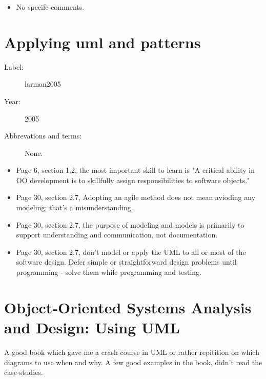 \begin{itemize}
    \item No specifc comments.
\end{itemize}

\section{Applying uml and patterns}


\begin{description}
    \item[Label:] larman2005 \cite{larman2005}
    \item[Year:] 2005
    \item[Abbrevations and terms:] None.
\end{description}

\begin{itemize}
    \item Page 6, section 1.2, the most important skill to learn is "A critical
        ability in OO development is to skillfully assign responsibilities to
        software objects."
    \item Page 30, section 2.7, Adopting an agile method does not mean avioding
        any modeling; that's a misunderstanding.
    \item Page 30, section 2.7, the purpose of modeling and models is primarily
        to support understanding and communication, not documentation.
    \item Page 30, section 2.7, don't model or apply the UML to all or most of
        the software design. Defer simple or straightforward design problems
        until programming - solve them while programming and testing.
\end{itemize}

\section{Object-Oriented Systems Analysis and Design: Using UML}
A good book which gave me a crash course in UML or rather repitition on which
diagrams to use when and why. A few good examples in the book, didn't read the
case-studies.

